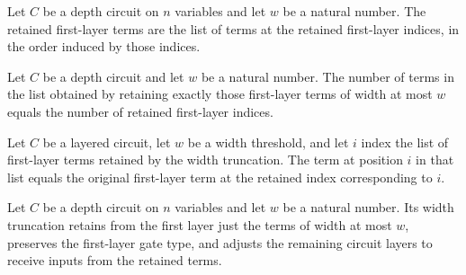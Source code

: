 \begin{definition}
\label{FABL.DepthCircuit.retainedLayer1}
\leanok
{}
Let $C$ be a depth circuit on $n$ variables and let $w$ be a natural number. The
retained first-layer terms are the list of terms at the retained first-layer indices, in
the order induced by those indices.
\end{definition}

\begin{theorem}
\label{FABL.DepthCircuit.length_retainedLayer1}
\leanok
{}
Let $C$ be a depth circuit and let $w$ be a natural number. The number of terms in the
list obtained by retaining exactly those first-layer terms of width at most $w$ equals
the number of retained first-layer indices.
\end{theorem}

\begin{theorem}
\label{FABL.DepthCircuit.get_retainedLayer1}
\leanok
{}
Let $C$ be a layered circuit, let $w$ be a width threshold, and let $i$ index the list
of first-layer terms retained by the width truncation. The term at position $i$ in that
list equals the original first-layer term at the retained index corresponding to $i$.
\end{theorem}

\begin{definition}
\label{FABL.DepthCircuit.truncateWidth}
\leanok
{}
Let $C$ be a depth circuit on $n$ variables and let $w$ be a natural number. Its width
truncation retains from the first layer just the terms of width at most $w$, preserves
the first-layer gate type, and adjusts the remaining circuit layers to receive inputs
from the retained terms.
\end{definition}

